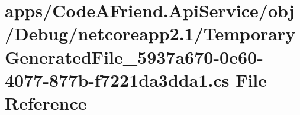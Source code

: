 \hypertarget{apps_2_code_a_friend_8_api_service_2obj_2_debug_2netcoreapp2_81_2_temporary_generated_file__5937b410d00b7152a6571aa3e1f19b5128ae}{}\section{apps/\+Code\+A\+Friend.Api\+Service/obj/\+Debug/netcoreapp2.1/\+Temporary\+Generated\+File\+\_\+5937a670-\/0e60-\/4077-\/877b-\/f7221da3dda1.cs File Reference}
\label{apps_2_code_a_friend_8_api_service_2obj_2_debug_2netcoreapp2_81_2_temporary_generated_file__5937b410d00b7152a6571aa3e1f19b5128ae}
